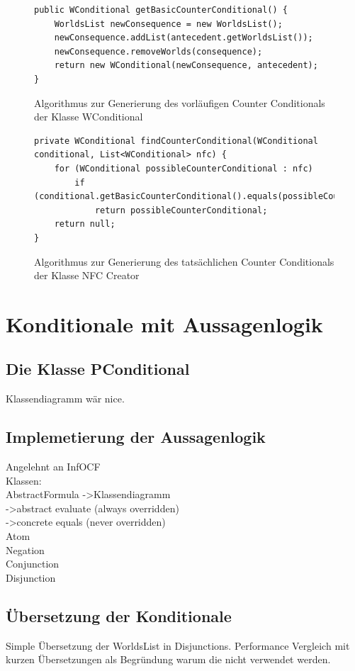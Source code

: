 \documentclass[12pt,a4paper]{article}
\begin{document}
\begin{figure}
\begin{lstlisting}
public WConditional getBasicCounterConditional() {
    WorldsList newConsequence = new WorldsList();
    newConsequence.addList(antecedent.getWorldsList());
    newConsequence.removeWorlds(consequence);
    return new WConditional(newConsequence, antecedent);
}
\end{lstlisting}
\caption{Algorithmus zur Generierung des vorläufigen Counter Conditionals der Klasse WConditional}
\label{code:basic-counter}
\end{figure} 


\begin{figure}
\begin{lstlisting}
private WConditional findCounterConditional(WConditional conditional, List<WConditional> nfc) {
    for (WConditional possibleCounterConditional : nfc)
        if (conditional.getBasicCounterConditional().equals(possibleCounterConditional))
            return possibleCounterConditional;
    return null;
}
\end{lstlisting}
\caption{Algorithmus zur Generierung des tatsächlichen Counter Conditionals der Klasse NFC Creator}
\label{code:real-counter}
\end{figure} 




\section{Konditionale mit Aussagenlogik}
\subsection{Die Klasse PConditional}
Klassendiagramm wär nice.
\subsection{Implemetierung der Aussagenlogik}
Angelehnt an InfOCF \\
Klassen: \\
AbstractFormula ->Klassendiagramm\\
->abstract evaluate (always overridden)\\
->concrete equals (never overridden)\\
Atom\\
Negation\\
Conjunction\\
Disjunction\\
\subsection{Übersetzung der Konditionale}
Simple Übersetzung der WorldsList in Disjunctions. Performance Vergleich mit kurzen Übersetzungen als Begründung warum die nicht verwendet werden.
\end{document}

